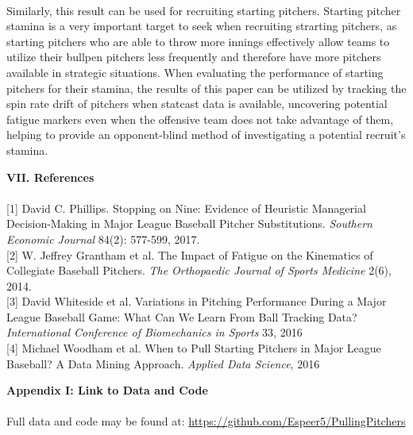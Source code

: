 \documentclass[12 pt]{article}
\begin{document}
\\ \indent Similarly, this result can be used for recruiting starting pitchers. Starting pitcher 
stamina is a very important target to seek when recruiting strarting pitchers, as starting pitchers who 
are able to throw more innings effectively allow teams to utilize their bullpen pitchers less frequently 
and therefore have more pitchers available in strategic situations. When evaluating the performance of starting 
pitchers for their stamina, the results of this paper can be utilized by tracking the spin rate 
drift of pitchers when statcast data is available, uncovering potential fatigue markers even when the offensive 
team does not take advantage of them, helping to provide an opponent-blind method of 
investigating a potential recruit's stamina.

\pagebreak
\textbf{VII. References} \\
\\
\hypertarget{1}{[1]} David C. Phillips. Stopping on Nine: Evidence of Heuristic 
Managerial Decision-Making in Major League Baseball Pitcher Substitutions.
\emph{Southern Economic Journal} 84(2): 577-599, 2017.
\\
\hypertarget{2}{[2]} W. Jeffrey Grantham et al. The Impact of Fatigue on the Kinematics 
of Collegiate Baseball Pitchers. \emph{The Orthopaedic Journal of Sports Medicine}
2(6), 2014.
\\
\hypertarget{3}{[3]} David Whiteside et al. Variations in Pitching Performance During a 
Major League Baseball Game: What Can We Learn From Ball Tracking Data? 
\emph{International Conference of Biomechanics in Sports} 33, 2016
\\
\hypertarget{4}{[4]} Michael Woodham et al. When to Pull Starting Pitchers in Major League Baseball? A Data Mining Approach.
\emph{Applied Data Science}, 2016


\pagebreak
\textbf{Appendix I: Link to Data and Code} \\
\\
Full data and code may be found at: \url{https://github.com/Espeer5/PullingPitchers}
\end{document}
